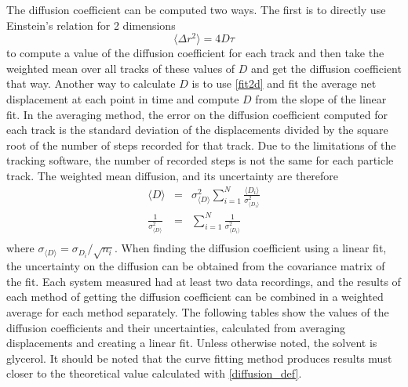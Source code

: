 \documentclass[11pt,letterpaper]{article}
\begin{document}

The diffusion coefficient can be computed two ways. The first is to directly use
Einstein's relation for 2 dimensions
\begin{equation}
    \langle \Delta r^2 \rangle = 4D \tau
    \label{fit2d}
\end{equation}
to compute a value of the diffusion coefficient for each track and then take the
weighted mean over all tracks of these values of $D$ and get the diffusion
coefficient that way. Another way to calculate $D$ is to use \eqref{fit2d} and
fit the average net displacement at each point in time and compute $D$ from the
slope of the linear fit. In the averaging method, the error on the diffusion
coefficient computed for each track is the standard deviation of the
displacements divided by the square root of the number of steps recorded for
that track. Due to the limitations of the tracking software, the number of
recorded steps is not the same for each particle track. The weighted mean
diffusion, and its uncertainty are therefore
\begin{equation}
    \begin{aligned}
        \langle D \rangle & = &
            \sigma^2_{\langle D \rangle}
            \sum\limits_{i=1}^N
            \frac{\langle D_i \rangle}{\sigma^2_{\langle D_i \rangle}} \\
        \frac{1}{\sigma^2_{\langle D \rangle}} & = &
            \sum\limits_{i=1}^N \frac{1}{\sigma^2_{\langle D_i \rangle}} \\
    \end{aligned}
\end{equation}
where $\sigma_{\langle D \rangle} = \sigma_{D_i} / \sqrt{n_i}$. When finding
the diffusion coefficient using a linear fit, the uncertainty on the diffusion
can be obtained from the covariance matrix of the fit. Each system measured had
at least two data recordings, and the results of each method of getting the
diffusion coefficient can be combined in a weighted average for each method
separately. The following tables show the values of the diffusion coefficients
and their uncertainties, calculated from averaging displacements and creating a
linear fit. Unless otherwise noted, the solvent is glycerol. It should be noted
that the curve fitting method produces results must closer to the theoretical
value calculated with \eqref{diffusion_def}.\\
\end{document}

